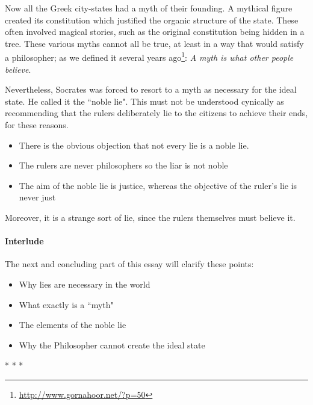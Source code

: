 Now all the Greek city-states had a myth of their founding. A mythical figure created its constitution which justified the organic structure of the state. These often involved magical stories, such as the original constitution being hidden in a tree. These various myths cannot all be true, at least in a way that would satisfy a philosopher; as we defined it several years ago\footnote{\url{http://www.gornahoor.net/?p=50}}: \emph{A myth is what other people believe}.

Nevertheless, Socrates was forced to resort to a myth as necessary for the ideal state. He called it the ``noble lie". This must not be understood cynically as recommending that the rulers deliberately lie to the citizens to achieve their ends, for these reasons.

\begin{itemize}
\item There is the obvious objection that not every lie is a noble lie. 
\item The rulers are never philosophers so the liar is not noble 
\item The aim of the noble lie is justice, whereas the objective of the ruler's lie is never just 
\end{itemize}
Moreover, it is a strange sort of lie, since the rulers themselves must believe it.

\paragraph{Interlude}
The next and concluding part of this essay will clarify these points:

\begin{itemize}
\item Why lies are necessary in the world 
\item What exactly is a ``myth" 
\item The elements of the noble lie 
\item Why the Philosopher cannot create the ideal state 
\end{itemize}



\begin{center}* * *\end{center}


